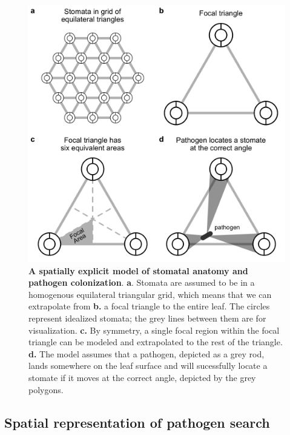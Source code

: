 \documentclass[utf8]{frontiersSCNS}
\begin{document}
\begin{figure}
  \centering
    \includegraphics[width=6.5in]{../figures/fig1.jpeg}
    \caption{\textbf{A spatially explicit model of stomatal anatomy and pathogen colonization}. \textbf{a}. Stomata are assumed to be in a homogenous equilateral triangular grid, which means that we can extrapolate from \textbf{b.} a focal triangle to the entire leaf. The circles represent idealized stomata; the grey lines between them are for visualization. \textbf{c.} By symmetry, a single focal region within the focal triangle can be modeled and extrapolated to the rest of the triangle. \textbf{d.} The model assumes that a pathogen, depicted as a grey rod, lands somewhere on the leaf surface and will sucessfully locate a stomate if it moves at the correct angle, depicted by the grey polygons.}
    \label{fig:fig1}
\end{figure}

\hypertarget{spatial-representation-of-pathogen-search}{%
\subsection*{Spatial representation of pathogen
search}\label{spatial-representation-of-pathogen-search}}
\end{document}
